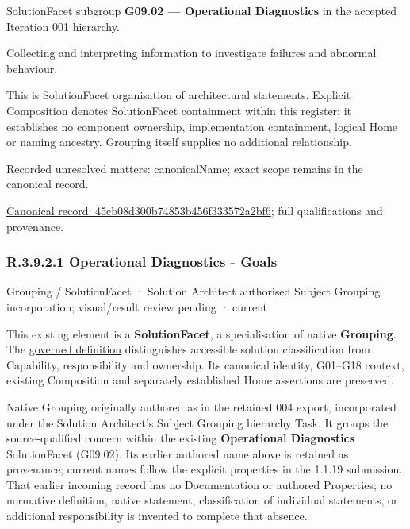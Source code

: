 SolutionFacet subgroup \textbf{G09.02 — Operational Diagnostics} in the accepted Iteration 001 hierarchy.



Collecting and interpreting information to investigate failures and abnormal behaviour.



This is SolutionFacet organisation of architectural statements. Explicit Composition denotes SolutionFacet containment within this register; it establishes no component ownership, implementation containment, logical Home or naming ancestry. Grouping itself supplies no additional relationship.


{\small Recorded unresolved matters: canonicalName; exact scope remains in the canonical record.}\par
{\footnotesize \href{../../../../../../../continuum/grouping/45cb08d300b74853b456f333572a2bf6.md}{Canonical record: 45cb08d300b74853b456f333572a2bf6}; full qualifications and provenance.}\par
\subsubsection*{R.3.9.2.1 Operational Diagnostics - Goals}
\label{navigation:R.3.9.2.1}

\label{element:99436452c53a49b89fa6bc2863557572}
{\small Grouping / SolutionFacet · Solution Architect authorised Subject Grouping incorporation; visual/result review pending · current}\par

This existing element is a \textbf{SolutionFacet}, a specialisation of native
\textbf{Grouping}. The \href{\detokenize{../../../../../../../governance/continuum-representation.md#solutionfacet-classification--1119-candidate}}{governed definition}
distinguishes accessible solution classification from Capability, responsibility
and ownership. Its canonical identity, G01–G18 context, existing Composition
and separately established Home assertions are preserved.



Native Grouping originally authored as \texttt{} in the retained 004 export,
incorporated under the Solution Architect's Subject Grouping hierarchy Task.
It groups the source-qualified \texttt{} concern within
the existing \textbf{Operational Diagnostics} SolutionFacet (G09.02). Its earlier authored name above is retained as provenance; current names
follow the explicit properties in the 1.1.19 submission.
That earlier incoming record has no Documentation or authored Properties; no normative
definition, native statement, classification of individual statements, or
additional responsibility is invented to complete that absence.



